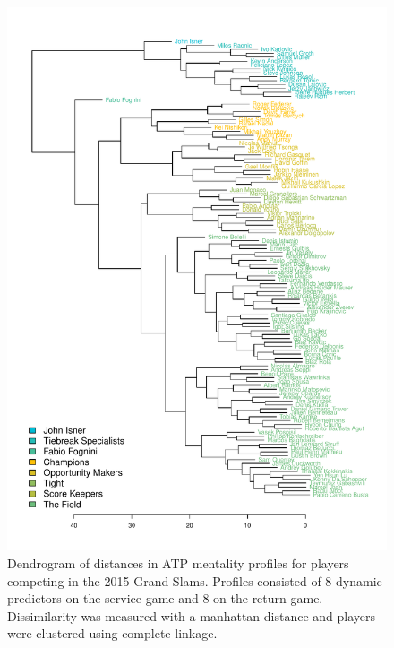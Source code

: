 \documentclass{Latex/svjour3}
\begin{document}
\begin{figure}
\includegraphics[scale=0.9]{figs/atp_dendro_std_fixed.pdf}
\caption{Dendrogram of distances in ATP mentality profiles for players competing
  in the 2015 Grand Slams. Profiles consisted of 8 dynamic predictors on the
  service game and 8 on the return game. Dissimilarity was measured with a
  manhattan distance and players were clustered using complete linkage.}
\label{fig:atp_dendro}
\end{figure}

\clearpage
\end{document}
